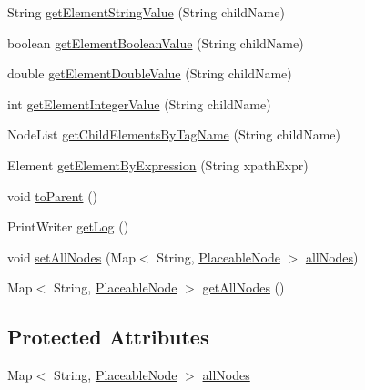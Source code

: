 \begin{DoxyCompactItemize}
\item 
String \hyperlink{classorg_1_1tzi_1_1use_1_1gui_1_1util_1_1_persist_helper_ae9652d90f6d3ac8554c326b7008e66e5}{get\-Element\-String\-Value} (String child\-Name)
\item 
boolean \hyperlink{classorg_1_1tzi_1_1use_1_1gui_1_1util_1_1_persist_helper_a4f4ce4b593815ecab6e438b94484cb66}{get\-Element\-Boolean\-Value} (String child\-Name)
\item 
double \hyperlink{classorg_1_1tzi_1_1use_1_1gui_1_1util_1_1_persist_helper_a451a5547149c87d52d3f2f234eb25ad7}{get\-Element\-Double\-Value} (String child\-Name)
\item 
int \hyperlink{classorg_1_1tzi_1_1use_1_1gui_1_1util_1_1_persist_helper_a523c343473fe0acc0a09ec11026115fd}{get\-Element\-Integer\-Value} (String child\-Name)
\item 
Node\-List \hyperlink{classorg_1_1tzi_1_1use_1_1gui_1_1util_1_1_persist_helper_adde05ba4d9e183752b595485b04389fd}{get\-Child\-Elements\-By\-Tag\-Name} (String child\-Name)
\item 
Element \hyperlink{classorg_1_1tzi_1_1use_1_1gui_1_1util_1_1_persist_helper_a71816454a3def7957c01194ef1142dd3}{get\-Element\-By\-Expression} (String xpath\-Expr)
\item 
void \hyperlink{classorg_1_1tzi_1_1use_1_1gui_1_1util_1_1_persist_helper_a80abcdd314e454b59db8a2030559bdf2}{to\-Parent} ()
\item 
Print\-Writer \hyperlink{classorg_1_1tzi_1_1use_1_1gui_1_1util_1_1_persist_helper_ad13f65d4470083374f743fd89d56d68b}{get\-Log} ()
\item 
void \hyperlink{classorg_1_1tzi_1_1use_1_1gui_1_1util_1_1_persist_helper_af01a412555a38f661a9352750b22188d}{set\-All\-Nodes} (Map$<$ String, \hyperlink{classorg_1_1tzi_1_1use_1_1gui_1_1views_1_1diagrams_1_1elements_1_1_placeable_node}{Placeable\-Node} $>$ \hyperlink{classorg_1_1tzi_1_1use_1_1gui_1_1util_1_1_persist_helper_a03b0957db60f5494f8f0a9dad40f2373}{all\-Nodes})
\item 
Map$<$ String, \hyperlink{classorg_1_1tzi_1_1use_1_1gui_1_1views_1_1diagrams_1_1elements_1_1_placeable_node}{Placeable\-Node} $>$ \hyperlink{classorg_1_1tzi_1_1use_1_1gui_1_1util_1_1_persist_helper_a180d6d6a8fc14bdc251139eabebbe204}{get\-All\-Nodes} ()
\end{DoxyCompactItemize}
\subsection*{Protected Attributes}
\begin{DoxyCompactItemize}
\item 
Map$<$ String, \hyperlink{classorg_1_1tzi_1_1use_1_1gui_1_1views_1_1diagrams_1_1elements_1_1_placeable_node}{Placeable\-Node} $>$ \hyperlink{classorg_1_1tzi_1_1use_1_1gui_1_1util_1_1_persist_helper_a03b0957db60f5494f8f0a9dad40f2373}{all\-Nodes}
\end{DoxyCompactItemize}


